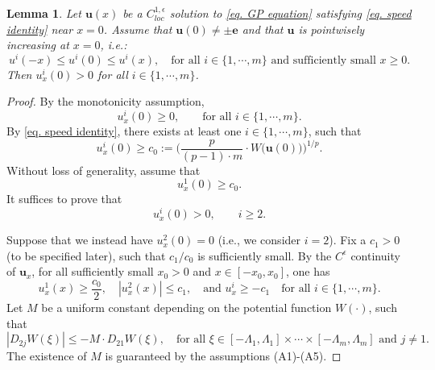 \documentclass[11pt,twoside,reqno]{amsart}
\newcounter{assu}
\newtheorem{lemma}{Lemma}[section]
\numberwithin{equation}{section}
\begin{document}
\begin{lemma}\label{le5.3}
    Let $\mathbf{u}(x)$ be a $C^{1,\epsilon}_{loc}$ solution to \eqref{eq. GP equation} satisfying \eqref{eq. speed identity} near $x=0$. Assume that $\mathbf{u}(0)\neq\pm\mathbf{e}$ and that $\mathbf{u}$ is pointwisely increasing at $x=0$, i.e.:
    \begin{equation*}
        u^{i}(-x)\leq u^{i}(0)\leq u^{i}(x),\quad\mbox{for all }i\in\{1,\cdots,m\}\mbox{ and sufficiently small }x\geq0.
    \end{equation*}
    Then $u^{i}_{x}(0)>0$ for all $i\in\{1,\cdots,m\}$.
\end{lemma}
\begin{proof}
By the monotonicity assumption,
\[
u_x^i(0)\geq0,
\qquad\mbox{for all }i\in\{1,\cdots,m\}.
\]
    By \eqref{eq. speed identity}, there exists at least one $i\in\{1,\cdots,m\}$, such that
    \begin{equation*}
        u^{i}_{x}(0)\geq c_{0}:=\Big(\frac{p}{(p-1)\cdot m}\cdot W\big(\mathbf{u}(0)\big)\Big)^{1/p}.
    \end{equation*}
Without loss of generality, assume that
\[
u_x^1(0)\geq c_0 .
\]
It suffices to prove that
\[
u_x^i(0)>0,\qquad i\geq2 .
\]

    

    Suppose that we instead have $u^{2}_{x}(0)=0$ (i.e., we consider $i=2$). Fix a $c_{1}>0$ (to be specified later), such that $c_{1}/c_{0}$ is sufficiently small. By the $C^{\epsilon}$ continuity of $\mathbf{u}_{x}$, for all sufficiently small $x_{0}>0$ and $x\in[-x_{0},x_{0}]$, one has
    \begin{equation}\label{eq. severe derivative difference}
        u^{1}_{x}(x)\geq\frac{c_{0}}{2},\quad|u^{2}_{x}(x)|\leq c_{1},\quad\mbox{and }u^{i}_{x}\geq-c_{1}\quad\mbox{for all }i\in\{1,\cdots,m\}.
    \end{equation}
    Let $M$ be a uniform constant depending on the potential function $W(\cdot)$, such that
    \begin{equation}\label{eq. very negative mixed derivative}
        |D_{2j}W(\xi)|\leq-M\cdot D_{21}W(\xi),\quad\mbox{for all }\xi\in[-\Lambda_{1},\Lambda_{1}]\times\cdots\times[-\Lambda_{m},\Lambda_{m}]\mbox{ and }j\neq1.
    \end{equation}
    The existence of $M$ is guaranteed by the assumptions (A1)-(A5).
    

\end{proof}
\end{document}
